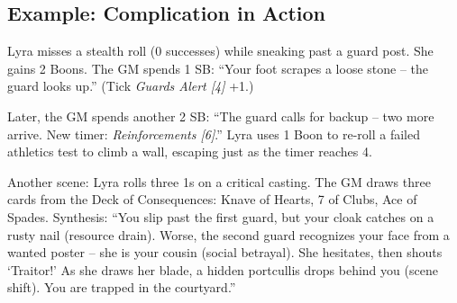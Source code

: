 \subsection{Example: Complication in Action}

Lyra misses a stealth roll (0 successes) while sneaking past a guard post. She gains 2 Boons. The GM spends 1 SB: ``Your foot scrapes a loose stone -- the guard looks up.'' (Tick \textit{Guards Alert [4]} +1.)

Later, the GM spends another 2 SB: ``The guard calls for backup -- two more arrive. New timer: \textit{Reinforcements [6]}.'' Lyra uses 1 Boon to re-roll a failed athletics test to climb a wall, escaping just as the timer reaches 4.

Another scene: Lyra rolls three 1s on a critical casting. The GM draws three cards from the Deck of Consequences: Knave of Hearts, 7 of Clubs, Ace of Spades. Synthesis: ``You slip past the first guard, but your cloak catches on a rusty nail (resource drain). Worse, the second guard recognizes your face from a wanted poster -- she is your cousin (social betrayal). She hesitates, then shouts `Traitor!' As she draws her blade, a hidden portcullis drops behind you (scene shift). You are trapped in the courtyard.''

